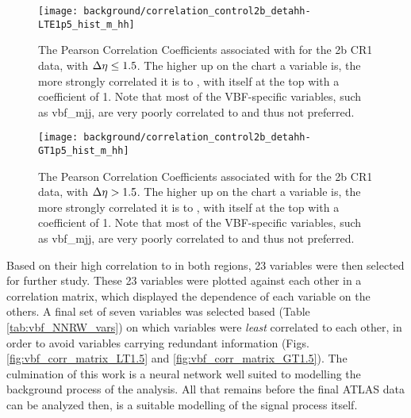     \begin{sidewaysfigure}[tbh]
        \texttt{[image: background/correlation\_control2b\_detahh-LTE1p5\_hist\_m\_hh]}
        \caption{
            The Pearson Correlation Coefficients associated with \mhh for the 2b CR1 data,
                with $\Delta \eta \leq 1.5$.
            The higher up on the chart a variable is, the more strongly correlated it is to \mhh,
                with \mhh itself at the top with a coefficient of 1.
            Note that most of the VBF-specific variables, such as vbf\_mjj, are very poorly correlated to \mhh and thus not preferred.
        }
        \label{fig:mhh_corrLT1.5}
    \end{sidewaysfigure}

    \begin{sidewaysfigure}[tbh]
        \texttt{[image: background/correlation\_control2b\_detahh-GT1p5\_hist\_m\_hh]}
        \caption{
            The Pearson Correlation Coefficients associated with \mhh for the 2b CR1 data,
                with $\Delta \eta > 1.5$.
            The higher up on the chart a variable is, the more strongly correlated it is to \mhh,
                with \mhh itself at the top with a coefficient of 1.
            Note that most of the VBF-specific variables, such as vbf\_mjj, are very poorly correlated to \mhh and thus not preferred.
        }
        \label{fig:mhh_corrGT1.5}
    \end{sidewaysfigure}

    Based on their high correlation to \mhh in both \deta regions, 23 variables were then selected for further study.
    These 23 variables were plotted against each other in a correlation matrix,
        which displayed the dependence of each variable on the others.
    A final set of seven variables was selected based (Table \ref{tab:vbf_NNRW_vars}) on which variables were \textit{least} correlated to each other,
        in order to avoid variables carrying redundant information (Figs. \ref{fig:vbf_corr_matrix_LT1.5} and \ref{fig:vbf_corr_matrix_GT1.5}).
    The culmination of this work is a neural network well suited to modelling the background process of the analysis.
    All that remains before the final ATLAS data can be analyzed then,
        is a suitable modelling of the signal process itself.

